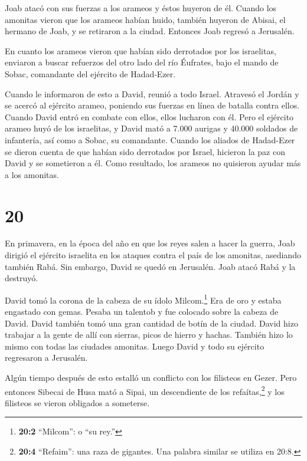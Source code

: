  Joab atacó con sus fuerzas a los arameos y éstos huyeron
de él.  Cuando los amonitas vieron que los arameos habían
huido, también huyeron de Abisai, el hermano de Joab, y se retiraron a
la ciudad. Entonces Joab regresó a Jerusalén.

 En cuanto los arameos vieron que habían sido derrotados
por los israelitas, enviaron a buscar refuerzos del otro lado del río
Éufrates, bajo el mando de Sobac, comandante del ejército de Hadad-Ezer.

 Cuando le informaron de esto a David, reunió a todo
Israel. Atravesó el Jordán y se acercó al ejército arameo, poniendo sus
fuerzas en línea de batalla contra ellos. Cuando David entró en combate
con ellos, ellos lucharon con él.  Pero el ejército arameo
huyó de los israelitas, y David mató a 7.000 aurigas y 40.000 soldados
de infantería, así como a Sobac, su comandante.  Cuando los
aliados de Hadad-Ezer se dieron cuenta de que habían sido derrotados por
Israel, hicieron la paz con David y se sometieron a él. Como resultado,
los arameos no quisieron ayudar más a los amonitas.

\hypertarget{section-19}{%
\section{20}\label{section-19}}

 En primavera, en la época del año en que los reyes salen a
hacer la guerra, Joab dirigió el ejército israelita en los ataques
contra el país de los amonitas, asediando también Rabá. Sin embargo,
David se quedó en Jerusalén. Joab atacó Rabá y la destruyó.

 David tomó la corona de la cabeza de su ídolo
Milcom.\footnote{\textbf{20:2} ``Milcom'': o ``su rey.''} Era de oro y
estaba engastado con gemas. Pesaba un talentob y fue colocado sobre la
cabeza de David. David también tomó una gran cantidad de botín de la
ciudad.  David hizo trabajar a la gente de allí con sierras,
picos de hierro y hachas. También hizo lo mismo con todas las ciudades
amonitas. Luego David y todo su ejército regresaron a Jerusalén.

 Algún tiempo después de esto estalló un conflicto con los
filisteos en Gezer. Pero entonces Sibecai de Husa mató a Sipai, un
descendiente de los refaítas,\footnote{\textbf{20:4} ``Refaim'': una
  raza de gigantes. Una palabra similar se utiliza en 20:8.} y los
filisteos se vieron obligados a someterse.

